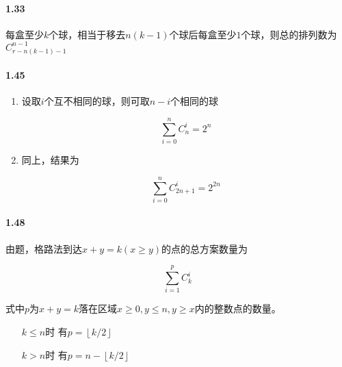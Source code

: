 \documentclass[UTF8]{ctexart}
\newcommand{\co}[2]{C_{#1}^{#2}}
\begin{document}
    \paragraph*{1.33} 每盒至少$k$个球，相当于移去$n(k - 1)$个球后每盒至少$1$个球，则总的排列数为$\co{r - n(k-1) - 1}{n - 1}$

    \paragraph*{1.45} 
    
    \begin{enumerate}[label=\textbf{(\arabic*)}, itemsep=0.2em]
        \item 设取$i$个互不相同的球，则可取$n - i$个相同的球
        
        \begin{equation}
            \sum_{i=0}^{n} \co{n}{i} = 2^n
        \end{equation}

        \item 同上，结果为
        
        \begin{equation}
            \sum_{i=0}^{n} \co{2n+1}i = 2^{2n}
        \end{equation}

    \end{enumerate}
    
    \paragraph*{1.48} 由题，格路法到达$x + y = k (x\geq y)$的点的总方案数量为

    \begin{equation}
        \sum_{i=1}^{p} \co ki
    \end{equation}

    式中$p$为$x + y = k$落在区域$x\geq 0, y\leq n, y\geq x$内的整数点的数量。

    \begin{enumerate}
        \item[$k\leq n$时] 有$p = \left\lfloor k/2 \right\rfloor$
        \item[$k> n$时] 有$p = n - \left\lfloor k/2 \right\rfloor$ 
    \end{enumerate}
\end{document}
